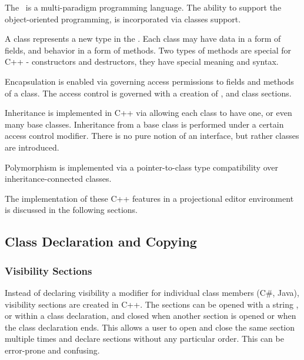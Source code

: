 
The \cpppl\ is a multi-paradigm programming language. The ability to support the object-oriented programming,
is incorporated via classes support. 

A class represents a new type in the \cpppl. Each class may have data in a 
form of fields, and behavior in a form of methods. Two types of methods are special for
C++ - constructors and destructors, they have special meaning and syntax.

Encapsulation is enabled via governing access permissions to fields and methods of a class.
The access control is governed with a creation of ,  and 
class sections.

Inheritance is implemented in C++ via allowing each class to have one, or even many base classes.
Inheritance from a base class is performed under a certain access control modifier. There is no pure notion 
of an interface, but rather  classes are introduced.

Polymorphism is implemented via a pointer-to-class type compatibility over inheritance-connected classes.

The implementation of these C++ features in a projectional editor environment is discussed in the
following sections.


\subsection{Class Declaration and Copying}
\label{section:classes}




\subsubsection{Visibility Sections}
\label{visibilitysections}



\cppproblem

Instead of declaring visibility a modifier for individual class members (C\#, Java), visibility sections are created
in C++. The sections can be opened with a string ,  or 
within a class declaration, and closed when another section is opened or when the class declaration
ends. This allows a user to open and close the same section multiple times and declare sections
without any particular order. This can be error-prone and confusing.

